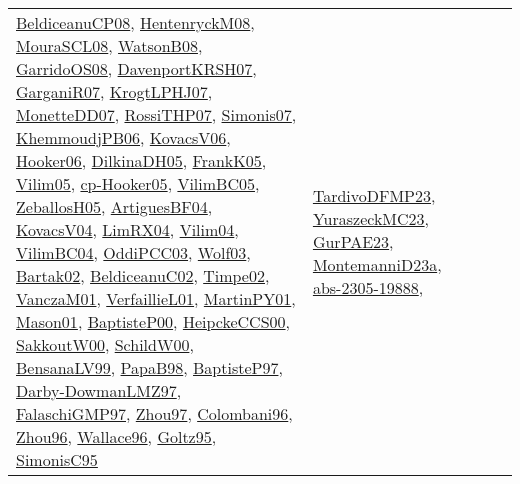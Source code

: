 {\begin{longtable}{llp{6cm}p{6cm}p{6cm}}
\href{papers/BeldiceanuCP08.pdf}{BeldiceanuCP08}\cite{BeldiceanuCP08}, \href{papers/HentenryckM08.pdf}{HentenryckM08}\cite{HentenryckM08}, \href{papers/MouraSCL08.pdf}{MouraSCL08}\cite{MouraSCL08}, \href{papers/WatsonB08.pdf}{WatsonB08}\cite{WatsonB08}, \href{articles/GarridoOS08.pdf}{GarridoOS08}\cite{GarridoOS08}, \href{papers/DavenportKRSH07.pdf}{DavenportKRSH07}\cite{DavenportKRSH07}, \href{papers/GarganiR07.pdf}{GarganiR07}\cite{GarganiR07}, \href{papers/KrogtLPHJ07.pdf}{KrogtLPHJ07}\cite{KrogtLPHJ07}, \href{papers/MonetteDD07.pdf}{MonetteDD07}\cite{MonetteDD07}, \href{papers/RossiTHP07.pdf}{RossiTHP07}\cite{RossiTHP07}, \href{articles/Simonis07.pdf}{Simonis07}\cite{Simonis07}, \href{papers/KhemmoudjPB06.pdf}{KhemmoudjPB06}\cite{KhemmoudjPB06}, \href{papers/KovacsV06.pdf}{KovacsV06}\cite{KovacsV06}, \href{articles/Hooker06.pdf}{Hooker06}\cite{Hooker06}, \href{papers/DilkinaDH05.pdf}{DilkinaDH05}\cite{DilkinaDH05}, \href{papers/FrankK05.pdf}{FrankK05}\cite{FrankK05}, \href{papers/Vilim05.pdf}{Vilim05}\cite{Vilim05}, \href{papers/cp-Hooker05.pdf}{cp-Hooker05}\cite{cp-Hooker05}, \href{articles/VilimBC05.pdf}{VilimBC05}\cite{VilimBC05}, \href{articles/ZeballosH05.pdf}{ZeballosH05}\cite{ZeballosH05}, \href{papers/ArtiguesBF04.pdf}{ArtiguesBF04}\cite{ArtiguesBF04}, \href{papers/KovacsV04.pdf}{KovacsV04}\cite{KovacsV04}, \href{papers/LimRX04.pdf}{LimRX04}\cite{LimRX04}, \href{papers/Vilim04.pdf}{Vilim04}\cite{Vilim04}, \href{papers/VilimBC04.pdf}{VilimBC04}\cite{VilimBC04}, \href{papers/OddiPCC03.pdf}{OddiPCC03}\cite{OddiPCC03}, \href{papers/Wolf03.pdf}{Wolf03}\cite{Wolf03}, \href{papers/Bartak02.pdf}{Bartak02}\cite{Bartak02}, \href{papers/BeldiceanuC02.pdf}{BeldiceanuC02}\cite{BeldiceanuC02}, \href{articles/Timpe02.pdf}{Timpe02}\cite{Timpe02}, \href{papers/VanczaM01.pdf}{VanczaM01}\cite{VanczaM01}, \href{papers/VerfaillieL01.pdf}{VerfaillieL01}\cite{VerfaillieL01}, \href{articles/MartinPY01.pdf}{MartinPY01}\cite{MartinPY01}, \href{articles/Mason01.pdf}{Mason01}\cite{Mason01}, \href{articles/BaptisteP00.pdf}{BaptisteP00}\cite{BaptisteP00}, \href{articles/HeipckeCCS00.pdf}{HeipckeCCS00}\cite{HeipckeCCS00}, \href{articles/SakkoutW00.pdf}{SakkoutW00}\cite{SakkoutW00}, \href{articles/SchildW00.pdf}{SchildW00}\cite{SchildW00}, \href{articles/BensanaLV99.pdf}{BensanaLV99}\cite{BensanaLV99}, \href{articles/PapaB98.pdf}{PapaB98}\cite{PapaB98}, \href{papers/BaptisteP97.pdf}{BaptisteP97}\cite{BaptisteP97}, \href{articles/Darby-DowmanLMZ97.pdf}{Darby-DowmanLMZ97}\cite{Darby-DowmanLMZ97}, \href{articles/FalaschiGMP97.pdf}{FalaschiGMP97}\cite{FalaschiGMP97}, \href{articles/Zhou97.pdf}{Zhou97}\cite{Zhou97}, \href{papers/Colombani96.pdf}{Colombani96}\cite{Colombani96}, \href{papers/Zhou96.pdf}{Zhou96}\cite{Zhou96}, \href{articles/Wallace96.pdf}{Wallace96}\cite{Wallace96}, \href{papers/Goltz95.pdf}{Goltz95}\cite{Goltz95}, \href{papers/SimonisC95.pdf}{SimonisC95}\cite{SimonisC95} & \href{papers/TardivoDFMP23.pdf}{TardivoDFMP23}\cite{TardivoDFMP23}, \href{papers/YuraszeckMC23.pdf}{YuraszeckMC23}\cite{YuraszeckMC23}, \href{articles/GurPAE23.pdf}{GurPAE23}\cite{GurPAE23}, \href{articles/MontemanniD23a.pdf}{MontemanniD23a}\cite{MontemanniD23a}, \href{articles/abs-2305-19888.pdf}{abs-2305-19888}\cite{abs-2305-19888}, 
\end{longtable}}
